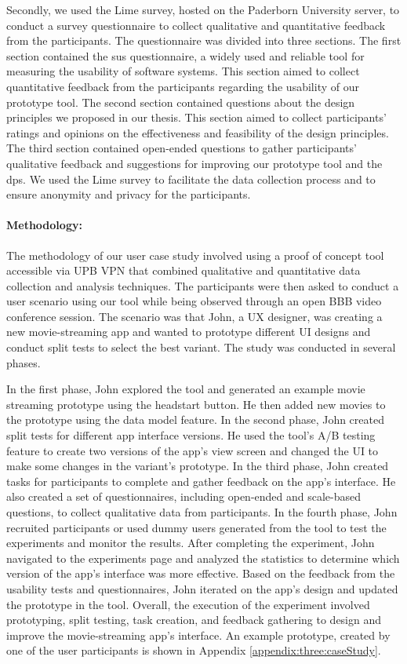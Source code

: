 Secondly, we used the Lime survey, hosted on the Paderborn University server, to conduct a survey questionnaire to collect qualitative and quantitative feedback from the participants. 
The questionnaire was divided into three sections. 
The first section contained the \ac{sus} questionnaire, a widely used and reliable tool for measuring the usability of software systems. 
This section aimed to collect quantitative feedback from the participants regarding the usability of our prototype tool. 
The second section contained questions about the design principles we proposed in our thesis. 
This section aimed to collect participants' ratings and opinions on the effectiveness and feasibility of the design principles. 
The third section contained open-ended questions to gather participants' qualitative feedback and suggestions for improving our prototype tool and the \ac{dp}s. 
We used the Lime survey to facilitate the data collection process and to ensure anonymity and privacy for the participants.

\paragraph{Methodology:}
The methodology of our user case study involved using a proof of concept tool accessible via UPB VPN that combined qualitative and quantitative data collection and analysis techniques. The participants were then asked to conduct a user scenario using our tool while being observed through an open BBB video conference session.
The scenario was that John, a UX designer, was creating a new movie-streaming app and wanted to prototype different UI designs and conduct split tests to select the best variant. 
The study was conducted in several phases.

In the first phase, John explored the tool and generated an example movie streaming prototype using the headstart button. He then added new movies to the prototype using the data model feature.
In the second phase, John created split tests for different app interface versions. 
He used the tool's A/B testing feature to create two versions of the app's view screen and changed the UI to make some changes in the variant's prototype.
In the third phase, John created tasks for participants to complete and gather feedback on the app's interface. 
He also created a set of questionnaires, including open-ended and scale-based questions, to collect qualitative data from participants.
In the fourth phase, John recruited participants or used dummy users generated from the tool to test the experiments and monitor the results. 
After completing the experiment, John navigated to the experiments page and analyzed the statistics to determine which version of the app's interface was more effective.
Based on the feedback from the usability tests and questionnaires, John iterated on the app's design and updated the prototype in the tool. 
Overall, the execution of the experiment involved prototyping, split testing, task creation, and feedback gathering to design and improve the movie-streaming app's interface. 
An example prototype, created by one of the user participants is shown in Appendix \ref{appendix:three:caseStudy}.

